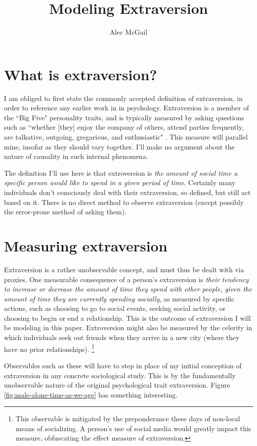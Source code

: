 \documentclass[]{article}
\title{Modeling Extraversion}
\author{Alec McGail}
\begin{document}
	\maketitle
	
	\section{What is extraversion?}
	I am obliged to first state the commonly accepted definition of extraversion, in order to reference any earlier work in in psychology. Extraversion is a member of the ``Big Five" personality traits, and is typically measured by asking questions such as ``whether [they] enjoy the company of others, attend parties	frequently, are talkative, outgoing, gregarious, and enthusiastic" \cite{Gosling2003}. This measure will parallel mine, insofar as they should vary together. I'll make no argument about the nature of causality in such internal phenomena.
	
	The definition I'll use here is that extroversion is \textit{the amount of social time a specific person would like to spend in a given period of time}. Certainly many individuals don't consciously deal with their extraversion, so defined, but still act based on it. There is no direct method to observe extraversion (except possibly the error-prone method of asking them).
	
	\section{Measuring extraversion}
	Extraversion is a rather unobservable concept, and must thus be dealt with via proxies.
	One measurable consequence of a person's extraversion is \textit{their tendency to increase or decrease the amount of time they spend with other people, given the amount of time they are currently spending socially}, as measured by specific actions, such as choosing to go to social events, seeking social activity, or choosing to begin or end a relationship. This is the outcome of extraversion I will be modeling in this paper. Extroversion might also be measured by the celerity in which individuals seek out friends when they arrive in a new city (where they have no prior relationships).
	\footnote{This observable is mitigated by the preponderance these days of non-local means of socializing. A person's use of social media would greatly impact this measure, obfuscating the effect measure of extraversion.}
	
	Observables such as these will have to step in place of my initial conception of extraversion in any concrete sociological study.
	This is by the fundamentally unobservable nature of the original psychological trait extraversion. Figure \ref{fig:male-alone-time-as-we-age} has something interesting.
\end{document}
